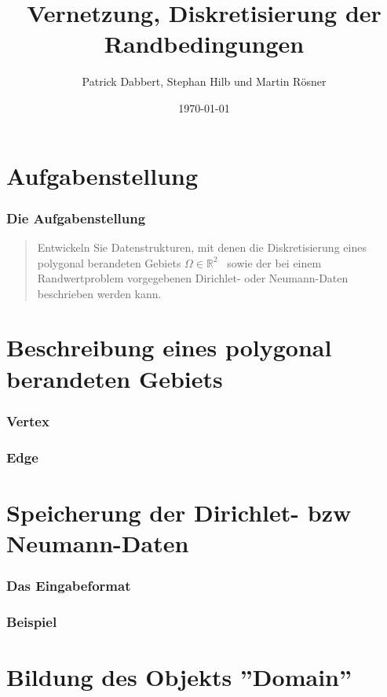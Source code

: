 \documentclass{beamer}
\title{Vernetzung, Diskretisierung der Randbedingungen}
\author{Patrick Dabbert, Stephan Hilb und Martin R\"osner}
\date{\today}
\begin{document}
\begin{frame}
	\titlepage
\end{frame}


\section{Aufgabenstellung}

\begin{frame}
	\frametitle{Die Aufgabenstellung}
	\begin{quote}
		Entwickeln Sie Datenstrukturen, mit denen die Diskretisierung eines polygonal berandeten Gebiets $\Omega \in \mathbb{R}^{2}$ \ sowie der bei einem Randwertproblem vorgegebenen Dirichlet- oder Neumann-Daten beschrieben werden kann.
	\end{quote}
\end{frame}


\section{Beschreibung eines polygonal berandeten Gebiets}

\begin{frame}
	\frametitle{Vertex}
	
\end{frame}

\begin{frame}
	\frametitle{Edge}
	
\end{frame}


\section{Speicherung der Dirichlet- bzw Neumann-Daten}

\begin{frame}[fragile]
	\frametitle{Das Eingabeformat}
	
\end{frame}

\begin{frame}[fragile]
	\frametitle{Beispiel}
	
\end{frame}


\section{Bildung des Objekts ''Domain''}
\end{document}
